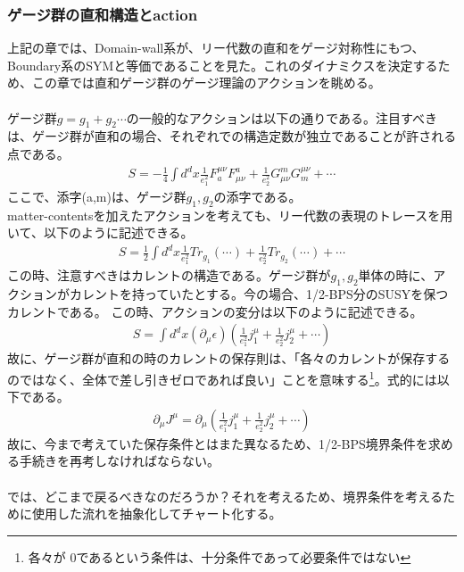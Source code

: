 \documentclass[dvipdfmx,a4paper,10.5pt]{article}
\numberwithin{equation}{section}
\begin{document}
\subsubsection{ゲージ群の直和構造とaction}
上記の章では、Domain-wall系が、リー代数の直和をゲージ対称性にもつ、Boundary系のSYMと等価であることを見た。これのダイナミクスを決定するため、この章では直和ゲージ群のゲージ理論のアクションを眺める。\\
\\
ゲージ群$g=g_{1}+g_{2}\cdots $の一般的なアクションは以下の通りである。注目すべきは、ゲージ群が直和の場合、それぞれでの構造定数が独立であることが許される点である。
\begin{align*}
    S=-\frac{1}{4}\int d^{d}x \frac{1}{e_{1}^{2}}F_{a}^{\mu\nu}F^{a}_{\mu\nu}+\frac{1}{e_{2}^{2}}G_{\mu\nu}^{m}G^{\mu\nu}_{m}+\cdots
\end{align*}
ここで、添字(a,m)は、ゲージ群$g_{1},g_{2}$の添字である。\\
matter-contentsを加えたアクションを考えても、リー代数の表現のトレースを用いて、以下のように記述できる。
\begin{align*}
    S=\frac{1}{2}\int d^{d}x \frac{1}{e_{1}^{2}}Tr_{g_{1}}(\cdots)+\frac{1}{e_{2}^{2}}Tr_{g_{2}}(\cdots)+\cdots
\end{align*}
この時、注意すべきはカレントの構造である。ゲージ群が$g_{1},g_{2}$単体の時に、アクションがカレントを持っていたとする。今の場合、1/2-BPS分のSUSYを保つカレントである。
この時、アクションの変分は以下のように記述できる。
\begin{align*}
    S
    =\int d^{d}x (\partial_{\mu}\epsilon)(\frac{1}{e_{1}^{2}}j_{1}^{\mu}+\frac{1}{e_{2}^{2}}j_{2}^{\mu}+\cdots)
\end{align*}
故に、ゲージ群が直和の時のカレントの保存則は、「各々のカレントが保存するのではなく、全体で差し引きゼロであれば良い」ことを意味する\footnote{各々が
0であるという条件は、十分条件であって必要条件ではない}。式的には以下である。
\begin{align*}
    \partial_{\mu}J^{\mu}=\partial_{\mu}(\frac{1}{e_{1}^{2}}j_{1}^{\mu}+\frac{1}{e_{2}^{2}}j_{2}^{\mu}+\cdots)
\end{align*}
故に、今まで考えていた保存条件とはまた異なるため、1/2-BPS境界条件を求める手続きを再考しなければならない。\\
\\
では、どこまで戻るべきなのだろうか？それを考えるため、境界条件を考えるために使用した流れを抽象化してチャート化する。
\end{document}
